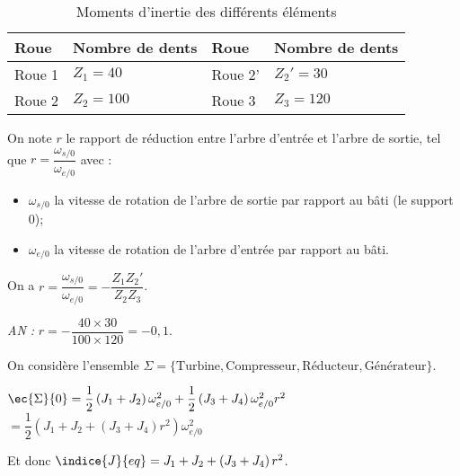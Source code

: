 \begin{table}[!h]
\begin{tabular}{llll}
\hline
Roue & Nombre de dents & Roue & Nombre de dents\\ \hline
Roue 1 		& $Z_1 = 40$ 	& Roue 2' 	& $Z_2' = 30$ 	\\
Roue 2 		& $Z_2 = 100$ 	& Roue 3	& $Z_3 = 120$ 	\\
 \hline
\end{tabular}
\caption{Moments d’inertie des différents éléments \label{tab_94_02}}
 \end{table}

 On note $r$ le rapport de réduction entre l’arbre d’entrée et l’arbre de sortie, tel que $r = \dfrac{\omega_{s/0}}{\omega_{e/0}}$ avec :
\begin{itemize}
 	\item  $\omega_{s/0}$ la vitesse de rotation de l’arbre de sortie par rapport au bâti (le support 0);
 	\item $\omega_{e/0}$ la vitesse de rotation de l’arbre d'entrée par rapport au bâti.
\end{itemize}

\fi


\ifprof
\begin{corrige}
On a $r = \dfrac{\omega_{s/0}}{\omega_{e/0}} = - \dfrac{Z_1 Z_2'}{Z_2 Z_3} $.

\textit{AN :} $r =  - \dfrac{40 \times 30}{100 \times 120}  = -0,1$.
\end{corrige}

\else
\fi

On considère l’ensemble $\Sigma =\{\text{Turbine}, \text{Compresseur}, \text{Réducteur}, \text{Générateur}\}$.

\ifprof 
\begin{corrige}
$\ec{\Sigma}{0} = \dfrac{1}{2}\left( J_1 + J_2 \right) \omega_{e/0}^2 + \dfrac{1}{2}\left( J_3 + J_4 \right) \omega_{e/0}^2r^2 $
$= \dfrac{1}{2}\left(  J_1 + J_2  + \left( J_3 + J_4 \right)r^2  \right)\omega_{e/0}^2$

Et donc $\indice{J}{eq}= J_1 + J_2  + \left( J_3 + J_4 \right)r^2 $.
\end{corrige}
\else
\fi





